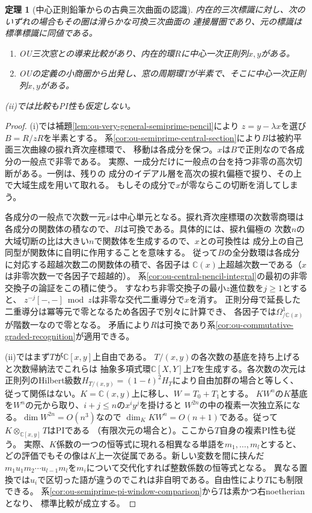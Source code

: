 \documentclass[11pt,a4paper]{ltjsarticle}
\newtheorem{theorem}{定理}[section]
\theoremstyle{definition}
\begin{document}
\begin{theorem}[中心正則鉛筆からの古典三次曲面の認識]
\label{thm:ou-regular-central-pencil-classical}
内在的三次標識に対し、次のいずれの場合もその圏は滑らかな可換三次曲面の
連接層圏であり、元の標識は標準標識に同値である。
\begin{enumerate}[label=(\roman*)]
\item OU三次窓との導来比較があり、内在的環$R$に中心一次正則列$x,y$がある。
\item OUの定義の小商圏から出発し、窓の周期環$T$が半素で、そこに中心一次正則列$x,y$がある。
\end{enumerate}
(ii)では比較もPI性も仮定しない。
\end{theorem}
\begin{proof}
(i)では補題\ref{lem:ou-very-general-semiprime-pencil}により
$z=y-\lambda x$を選び$B=R/zR$を半素とする。
系\ref{cor:ou-semiprime-central-section}により$B$は被約平面三次曲線の捩れ斉次座標環で、
移動は各成分を保つ。$x$は$B$で正則なので各成分の一般点で非零である。
実際、一成分だけに一般点の台を持つ非零の高次切断がある。一例は、残りの
成分のイデアル層を高次の捩れ偏極で捩り、その上で大域生成を用いて取れる。
もしその成分で$x$が零ならこの切断を消してしまう。

各成分の一般点で次数一元$x$は中心単元となる。捩れ斉次座標環の次数零商環は
各成分の関数体の積なので、$B$は可換である。具体的には、捩れ偏極の
次数$n$の大域切断の比は大きい$n$で関数体を生成するので、$x$との可換性は
成分上の自己同型が関数体に自明に作用することを意味する。
従って$B$の全分数環は各成分に対応する超越次数二の関数体の積で、各因子は
$\mathbb C(x)$上超越次数一である（$x$は非零次数一で各因子で超越的）。
系\ref{cor:ou-central-pencil-integral}の最初の非零交換子の論証をこの積に使う。
すなわち非零交換子の最小$z$進位数を$j\ge1$とすると、
$z^{-j}[-,-]\bmod z$は非零な交代二重導分で$x$を消す。
正則分母で延長した二重導分は冪等元で零となるため各因子で別々に計算でき、
各因子では$\Omega^1_{/\mathbb C(x)}$が階数一なので零となる。
矛盾により$R$は可換であり系\ref{cor:ou-commutative-graded-recognition}が適用できる。

(ii)ではまず$T$が$\mathbb C[x,y]$上自由である。
$T/(x,y)$の各次数の基底を持ち上げると次数帰納法でこれらは
抽象多項式環$\mathbb C[X,Y]$上$T$を生成する。各次数の次元は
正則列のHilbert級数$H_{T/(x,y)}=(1-t)^2H_T$により自由加群の場合と等しく、
従って関係はない。$K=\mathbb C(x,y)$上に移し、$W=T_0+T_1$とする。
$KW^n$の$K$基底を$W^n$の元から取り、$i+j\le n$の$x^iy^j$を掛けると
$W^{2n}$の中の複素一次独立系になる。$\dim W^{2n}=O(n^3)$なので
$\dim_K KW^n=O(n+1)$である。従って$K\otimes_{\mathbb C[x,y]}T$はPIである
（有限次元の場合と\cite{SSW1985}）。ここから$T$自身の複素PI性も従う。
実際、$K$係数の一つの恒等式に現れる相異なる単語を$m_1,\ldots,m_l$とすると、
どの評価でもその像は$K$上一次従属である。新しい変数を間に挟んだ
$m_1u_1m_2\cdots u_{l-1}m_l$を$m_i$について交代化すれば整数係数の恒等式となる。
異なる置換では$u_i$で区切った語が違うのでこれは非自明である。自由性により$T$にも制限できる。
系\ref{cor:ou-semiprime-pi-window-comparison}から$T$は素かつ右noetherianとなり、
標準比較が成立する。


\end{proof}
\end{document}
